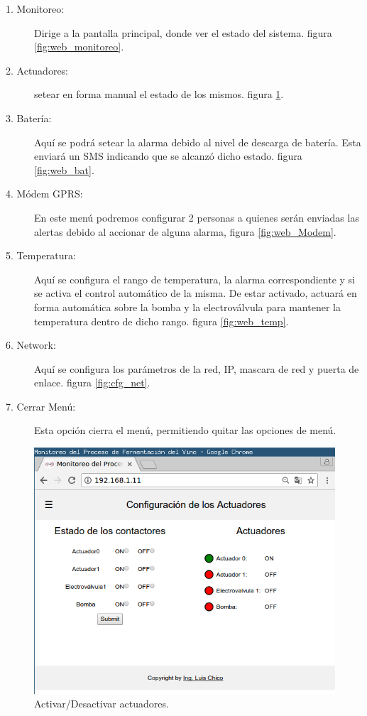 \begin{description}
  \item[1. Monitoreo:] Dirige a la pantalla principal, donde ver el estado del sistema. figura \ref{fig:web_monitoreo}.
  \item[2. Actuadores:] setear en forma manual el estado de los mismos. figura \ref{fig:web_act}.
  \item[3. Batería:] Aquí se podrá setear la alarma debido al nivel de descarga de batería. Esta enviará un SMS indicando que se alcanzó dicho estado. figura \ref{fig:web_bat}.
  \item[4. Módem GPRS:] En este menú podremos configurar 2 personas a quienes serán enviadas las alertas debido al accionar de alguna alarma, figura \ref{fig:web_Modem}.
  \item[5. Temperatura:] Aquí se configura el rango de temperatura, la alarma correspondiente y si se activa el control automático de la misma. De estar activado, actuará en forma automática sobre la bomba y la electroválvula para mantener la temperatura dentro de dicho rango. figura \ref{fig:web_temp}.
  \item[6. Network:] Aquí se configura los parámetros de la red, IP, mascara de red y puerta de enlace. figura \ref{fig:cfg_net}.
  \item[7. Cerrar Menú:] Esta opción cierra el menú, permitiendo quitar las opciones de menú.
\end{description}

\begin{figure}[h]
  \centering
  \includegraphics[scale=.35]{./Figures/config_act.png}
  \caption{ Activar/Desactivar actuadores.}
  \label{fig:web_act}
\end{figure}

